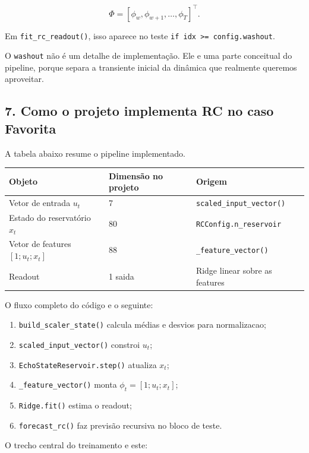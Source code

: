 \documentclass[12pt]{article}
\providecommand{\tightlist}{%
  \setlength{\itemsep}{0pt}\setlength{\parskip}{0pt}}
\begin{document}
\[
\Phi = [\phi_w, \phi_{w+1}, \dots, \phi_T]^\top.
\]

Em \texttt{fit\_rc\_readout()}, isso aparece no teste \texttt{if\ idx\ \textgreater{}=\ config.washout}.

O \texttt{washout} não é um detalhe de implementação. Ele e uma parte conceitual do pipeline, porque separa a transiente inicial da dinâmica que realmente queremos aproveitar.

\subsection{7. Como o projeto implementa RC no caso Favorita}\label{7-como-o-projeto-implementa-rc-no-caso-favorita}

A tabela abaixo resume o pipeline implementado.

\begin{longtable}[]{@{}lll@{}}
\toprule\noalign{}
Objeto & Dimensão no projeto & Origem \\
\midrule\noalign{}
\endhead
\bottomrule\noalign{}
\endlastfoot
Vetor de entrada \(u_t\) & 7 & \texttt{scaled\_input\_vector()} \\
Estado do reservatório \(x_t\) & 80 & \texttt{RCConfig.n\_reservoir} \\
Vetor de features \([1; u_t; x_t]\) & 88 & \texttt{\_feature\_vector()} \\
Readout & 1 saida & Ridge linear sobre as features \\
\end{longtable}

O fluxo completo do código e o seguinte:

\begin{enumerate}
\def\labelenumi{\arabic{enumi}.}
\tightlist
\item
  \texttt{build\_scaler\_state()} calcula médias e desvios para normalizacao;
\item
  \texttt{scaled\_input\_vector()} constroi \(u_t\);
\item
  \texttt{EchoStateReservoir.step()} atualiza \(x_t\);
\item
  \texttt{\_feature\_vector()} monta \(\phi_t = [1; u_t; x_t]\);
\item
  \texttt{Ridge.fit()} estima o readout;
\item
  \texttt{forecast\_rc()} faz previsão recursiva no bloco de teste.
\end{enumerate}

O trecho central do treinamento e este:
\end{document}
